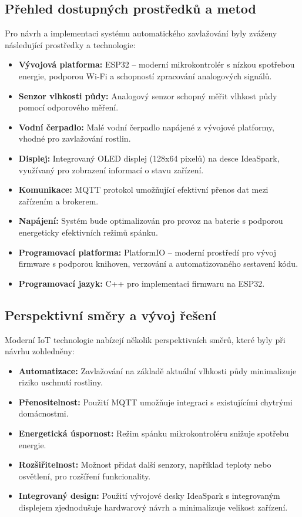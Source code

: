 \documentclass[a4paper, 11pt]{article}
\begin{document}
\subsection{Přehled dostupných prostředků a metod}

Pro návrh a implementaci systému automatického zavlažování byly zváženy následující prostředky a technologie:
\begin{itemize}
    \item \textbf{Vývojová platforma:} ESP32 – moderní mikrokontrolér s nízkou spotřebou energie, podporou Wi-Fi a schopností zpracování analogových signálů.
    \item \textbf{Senzor vlhkosti půdy:} Analogový senzor schopný měřit vlhkost půdy pomocí odporového měření.
    \item \textbf{Vodní čerpadlo:} Malé vodní čerpadlo napájené z vývojové platformy, vhodné pro zavlažování rostlin.
    \item \textbf{Displej:} Integrovaný OLED displej (128x64 pixelů) na desce IdeaSpark, využívaný pro zobrazení informací o stavu zařízení.
    \item \textbf{Komunikace:} MQTT protokol umožňující efektivní přenos dat mezi zařízením a brokerem.
    \item \textbf{Napájení:} Systém bude optimalizován pro provoz na baterie s podporou energeticky efektivních režimů spánku.
    \item \textbf{Programovací platforma:} PlatformIO – moderní prostředí pro vývoj firmware s podporou knihoven, verzování a automatizovaného sestavení kódu.
    \item \textbf{Programovací jazyk:} C++ pro implementaci firmwaru na ESP32.
\end{itemize}

\subsection{Perspektivní směry a vývoj řešení}

Moderní IoT technologie nabízejí několik perspektivních směrů, které byly při návrhu zohledněny:
\begin{itemize}
    \item \textbf{Automatizace:} Zavlažování na základě aktuální vlhkosti půdy minimalizuje riziko uschnutí rostliny.
    \item \textbf{Přenositelnost:} Použití MQTT umožňuje integraci s existujícími chytrými domácnostmi.
    \item \textbf{Energetická úspornost:} Režim spánku mikrokontroléru snižuje spotřebu energie.
    \item \textbf{Rozšiřitelnost:} Možnost přidat další senzory, například teploty nebo osvětlení, pro rozšíření funkcionality.
    \item \textbf{Integrovaný design:} Použití vývojové desky IdeaSpark s integrovaným displejem zjednodušuje hardwarový návrh a minimalizuje velikost zařízení.
\end{itemize}
\end{document}
